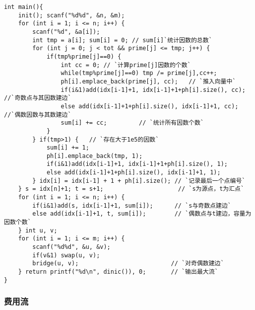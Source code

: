 \begin{lstlisting}
int main(){
    init(); scanf("%d%d", &n, &m);
    for (int i = 1; i <= n; i++) {
        scanf("%d", &a[i]);   
        int tmp = a[i]; sum[i] = 0; // sum[i]`统计因数的总数`
        for (int j = 0; j < tot && prime[j] <= tmp; j++) {
            if(tmp%prime[j]==0) {
                int cc = 0; // `计算prime[j]因数的个数`
                while(tmp%prime[j]==0) tmp /= prime[j],cc++;
                ph[i].emplace_back(prime[j], cc);   // `推入向量中`
                if(i&1)add(idx[i-1]+1, idx[i-1]+1+ph[i].size(), cc); //`奇数点与其因数建边`
                else add(idx[i-1]+1+ph[i].size(), idx[i-1]+1, cc);   //`偶数因数与其数建边`
                sum[i] += cc;         // `统计所有因数个数`
            }
        } if(tmp>1) {   // `存在大于1e5的因数`
            sum[i] += 1;
            ph[i].emplace_back(tmp, 1);
            if(i&1)add(idx[i-1]+1, idx[i-1]+1+ph[i].size(), 1);
            else add(idx[i-1]+1+ph[i].size(), idx[i-1]+1, 1);
        } idx[i] = idx[i-1] + 1 + ph[i].size(); // `记录最后一个点编号`
    } s = idx[n]+1; t = s+1;                     // `s为源点，t为汇点`
    for (int i = 1; i <= n; i++) {
        if(i&1)add(s, idx[i-1]+1, sum[i]);      // `s与奇数点建边`
        else add(idx[i-1]+1, t, sum[i]);        // `偶数点与t建边，容量为因数个数`
    } int u, v;
    for (int i = 1; i <= m; i++) {
        scanf("%d%d", &u, &v);
        if(v&1) swap(u, v);
        bridge(u, v);                          // `对奇偶数建边`
    } return printf("%d\n", dinic()), 0;       // `输出最大流`
}
\end{lstlisting}


\subsubsection{费用流}

